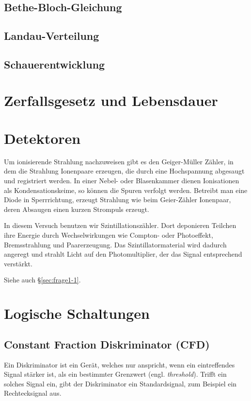\documentclass[11pt, ngerman, fleqn, DIV=15, headinclude, BCOR=2cm]{scrreprt}
\begin{document}
\subsection{Bethe-Bloch-Gleichung}

\subsection{Landau-Verteilung}

\subsection{Schauerentwicklung}

\section{Zerfallsgesetz und Lebensdauer}

\section{Detektoren}

Um ionisierende Strahlung nachzuweisen gibt es den Geiger-Müller Zähler, in dem
die Strahlung Ionenpaare erzeugen, die durch eine Hochspannung abgesaugt und
registriert werden. In einer Nebel- oder Blasenkammer dienen Ionisationen als
Kondensationskeime, so können die Spuren verfolgt werden. Betreibt man eine
Diode in Sperrrichtung, erzeugt Strahlung wie beim Geier-Zähler Ionenpaar,
deren Absaugen einen kurzen Strompuls erzeugt.

In diesem Versuch benutzen wir Szintillationszähler. Dort deponieren Teilchen
ihre Energie durch Wechselwirkungen wie Compton- oder Photoeffekt,
Bremsstrahlung und Paarerzeugung. Das Szintillatormaterial wird dadurch
angeregt und strahlt Licht auf den Photomultiplier, der das Signal entsprechend
verstärkt.

Siehe auch §\ref{sec:frage1-1}.

\section{Logische Schaltungen}

\subsection{Constant Fraction Diskriminator (CFD)}

Ein Diskriminator ist ein Gerät, welches nur anspricht, wenn ein eintreffendes
Signal stärker ist, als ein bestimmter Grenzwert (engl. \emph{threshold}).
Trifft ein solches Signal ein, gibt der Diskriminator ein Standardsignal, zum
Beispiel ein Rechtecksignal aus.
\end{document}
